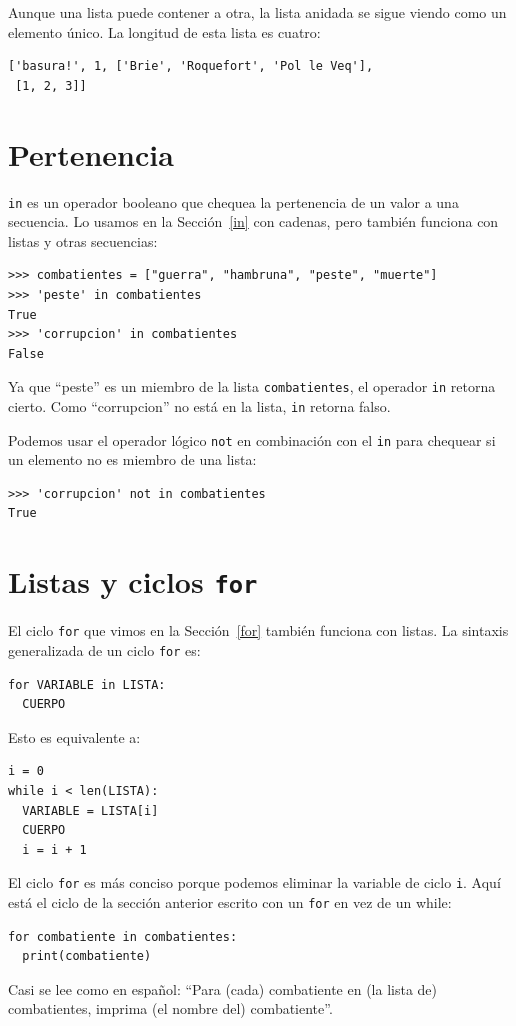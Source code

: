 Aunque una lista puede contener a otra, la lista anidada se sigue
viendo como un elemento único. La longitud de esta lista es cuatro:
\begin{lstlisting}
['basura!', 1, ['Brie', 'Roquefort', 'Pol le Veq'], 
 [1, 2, 3]]
\end{lstlisting}
\section{Pertenencia}

  

\texttt{in} es un operador booleano que chequea la pertenencia de
un valor a una secuencia. Lo usamos en la Sección~\ref{in} con cadenas,
pero también funciona con listas y otras secuencias:
\begin{lstlisting}
>>> combatientes = ["guerra", "hambruna", "peste", "muerte"]
>>> 'peste' in combatientes
True
>>> 'corrupcion' in combatientes
False
\end{lstlisting}
Ya que ``peste'' es un miembro de la lista \texttt{combatientes},
el operador \texttt{in} retorna cierto. Como ``corrupcion'' no está
en la lista, \texttt{in} retorna falso.

Podemos usar el operador lógico \texttt{not} en combinación con el
\texttt{in} para chequear si un elemento no es miembro de una lista:
\begin{lstlisting}
>>> 'corrupcion' not in combatientes
True
\end{lstlisting}
\section{Listas y ciclos \texttt{for}}

  

El ciclo \texttt{for} que vimos en la Sección~\ref{for} también
funciona con listas. La sintaxis generalizada de un ciclo \texttt{for}
es:
\begin{lstlisting}
for VARIABLE in LISTA:
  CUERPO
\end{lstlisting}
Esto es equivalente a:
\begin{lstlisting}
i = 0
while i < len(LISTA):
  VARIABLE = LISTA[i]
  CUERPO
  i = i + 1
\end{lstlisting}
El ciclo \texttt{for} es más conciso porque podemos eliminar la variable
de ciclo \texttt{i}. Aquí está el ciclo de la sección anterior escrito
con un \texttt{for} en vez de un while: 
\begin{lstlisting}
for combatiente in combatientes:
  print(combatiente)
\end{lstlisting}
Casi se lee como en español: ``Para (cada) combatiente en (la lista
de) combatientes, imprima (el nombre del) combatiente''.

